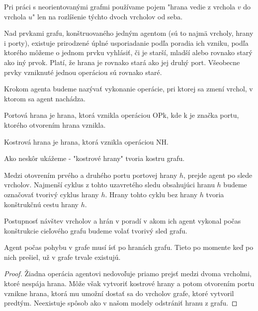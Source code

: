 \begin{pozn}
Pri práci s neorientovanými grafmi používame pojem "hrana vedie z vrchola
$v$
do vrchola $u$" len na rozlíšenie týchto dvoch vrcholov od seba.
\end{pozn}

\begin{ozn}
Nad prvkami grafu, konštruovaného jedným agentom
  (sú to najmä vrcholy, hrany i porty), existuje prirodzené úplné
usporiadanie podľa poradia ich vzniku, podľa ktorého môžeme o jednom prvku
vyhlásiť, či je starší, mladší alebo rovnako starý ako iný prvok. Platí, že
hrana je rovnako stará ako jej druhý port. Všeobecne prvky vzniknuté jednou
operáciou sú rovnako staré.
\end{ozn}

\begin{ozn}
Krokom agenta budeme nazývať vykonanie operácie, pri ktorej sa zmení vrchol,
v ktorom sa agent nachádza.
\end{ozn}

\begin{ozn}
Portová hrana je hrana, ktorá vznikla operáciou OPk, kde k je značka portu,
ktorého otvorením hrana vznikla.
\end{ozn}
\begin{ozn}
Kostrová hrana je hrana, ktorá vznikla operáciou NH.
\end{ozn}
\begin{pozn}
Ako neskôr ukážeme - "kostrové hrany" tvoria kostru grafu.
\end{pozn}

\begin{ozn}
Medzi otovrením prvého a druhého portu portovej hrany $h$, prejde agent po slede
vrcholov. Najmenší cyklus z tohto uzavretého sledu obsahujúci
 hranu $h$ budeme označovať tvorivý cyklus hrany $h$. Hrany tohto cyklu bez
hrany $h$ tvoria konštrukčnú cestu hrany $h$.
\end{ozn}

\begin{ozn}
Postupnosť návštev vrcholov a hrán v poradí v akom ich agent vykonal počas
konštrukcie cieľového grafu budeme volať tvorivý sled grafu.
\end{ozn}

\begin{lem}
Agent počas pohybu v grafe musí ísť po hranách grafu. 
Tieto po momente keď po nich prešiel, už v grafe trvale existujú.
\end{lem}

\begin{proof}
Žiadna operácia agentovi nedovoľuje priamo prejsť medzi dvoma vrcholmi, ktoré
nespája hrana. Môže však vytvoriť kostrové hrany a potom otvorením portu
vznikne hrana, ktorá mu umožní dostať sa do vrcholov grafe, ktoré vytvoril
predtým. Neexistuje spôsob ako v našom modely odstrániť hranu z grafu.
\end{proof}

